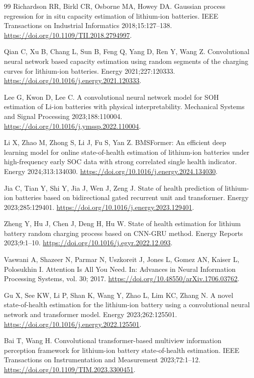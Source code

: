 \begin{thebibliography}{99}
 Richardson RR, Birkl CR, Osborne MA, Howey DA. Gaussian process regression for in situ capacity estimation of lithium-ion batteries. IEEE Transactions on Industrial Informatics 2018;15:127–138. \url{https://doi.org/10.1109/TII.2018.2794997}.

 Qian C, Xu B, Chang L, Sun B, Feng Q, Yang D, Ren Y, Wang Z. Convolutional neural network based capacity estimation using random segments of the charging curves for lithium-ion batteries. Energy 2021;227:120333. \url{https://doi.org/10.1016/j.energy.2021.120333}.

 Lee G, Kwon D, Lee C. A convolutional neural network model for SOH estimation of Li-ion batteries with physical interpretability. Mechanical Systems and Signal Processing 2023;188:110004. \url{https://doi.org/10.1016/j.ymssp.2022.110004}.

 Li X, Zhao M, Zhong S, Li J, Fu S, Yan Z. BMSFormer: An efficient deep learning model for online state-of-health estimation of lithium-ion batteries under high-frequency early SOC data with strong correlated single health indicator. Energy 2024;313:134030. \url{https://doi.org/10.1016/j.energy.2024.134030}.

 Jia C, Tian Y, Shi Y, Jia J, Wen J, Zeng J. State of health prediction of lithium-ion batteries based on bidirectional gated recurrent unit and transformer. Energy 2023;285:129401. \url{https://doi.org/10.1016/j.energy.2023.129401}.

 Zheng Y, Hu J, Chen J, Deng H, Hu W. State of health estimation for lithium battery random charging process based on CNN-GRU method. Energy Reports 2023;9:1–10. \url{https://doi.org/10.1016/j.egyr.2022.12.093}.

 Vaswani A, Shazeer N, Parmar N, Uszkoreit J, Jones L, Gomez AN, Kaiser L, Polosukhin I. Attention Is All You Need. In: Advances in Neural Information Processing Systems, vol. 30; 2017. \url{https://doi.org/10.48550/arXiv.1706.03762}.

 Gu X, See KW, Li P, Shan K, Wang Y, Zhao L, Lim KC, Zhang N. A novel state-of-health estimation for the lithium-ion battery using a convolutional neural network and transformer model. Energy 2023;262:125501. \url{https://doi.org/10.1016/j.energy.2022.125501}.

 Bai T, Wang H. Convolutional transformer-based multiview information perception framework for lithium-ion battery state-of-health estimation. IEEE Transactions on Instrumentation and Measurement 2023;72:1–12. \url{https://doi.org/10.1109/TIM.2023.3300451}.


\end{thebibliography}
